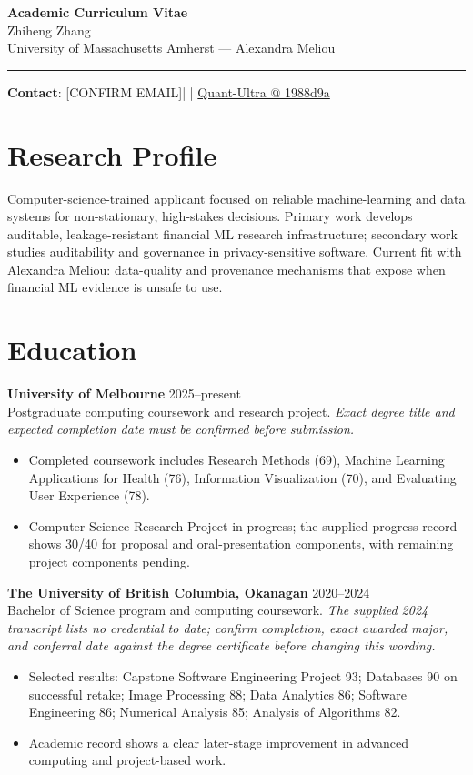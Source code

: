 \documentclass[11pt]{article}
\makeatletter
\newcommand{\ApplicantName}{Zhiheng Zhang}
\newcommand{\ApplicantEmail}{[CONFIRM EMAIL]}
\newcommand{\ApplicantPhone}{[CONFIRM PHONE]}
\newcommand{\ApplicantGitHub}{\href{https://github.com/zhiheng-zhang-Mera/Quant-Ultra/tree/1988d9a8530da91a8158de864d098ea869098923}{Quant-Ultra @ 1988d9a}}
\makeatother
\begin{document}
\begin{center}
{\LARGE\bfseries Academic Curriculum Vitae}\\[0.25em]
{\large \ApplicantName}\\
University of Massachusetts Amherst --- Alexandra Meliou
\end{center}
\vspace{0.35em}\hrule\vspace{0.65em}

\textbf{Contact}: \ApplicantEmail\quad | \quad \ApplicantPhone\quad | \quad \ApplicantGitHub

\section*{Research Profile}
Computer-science-trained applicant focused on reliable machine-learning and data systems for non-stationary, high-stakes decisions. Primary work develops auditable, leakage-resistant financial ML research infrastructure; secondary work studies auditability and governance in privacy-sensitive software. Current fit with Alexandra Meliou: data-quality and provenance mechanisms that expose when financial ML evidence is unsafe to use.

\section*{Education}
\textbf{University of Melbourne} \hfill 2025--present\\
Postgraduate computing coursework and research project. \textit{Exact degree title and expected completion date must be confirmed before submission.}
\begin{itemize}
\item Completed coursework includes Research Methods (69), Machine Learning Applications for Health (76), Information Visualization (70), and Evaluating User Experience (78).
\item Computer Science Research Project in progress; the supplied progress record shows 30/40 for proposal and oral-presentation components, with remaining project components pending.
\end{itemize}

\textbf{The University of British Columbia, Okanagan} \hfill 2020--2024\\
Bachelor of Science program and computing coursework. \textit{The supplied 2024 transcript lists no credential to date; confirm completion, exact awarded major, and conferral date against the degree certificate before changing this wording.}
\begin{itemize}
\item Selected results: Capstone Software Engineering Project 93; Databases 90 on successful retake; Image Processing 88; Data Analytics 86; Software Engineering 86; Numerical Analysis 85; Analysis of Algorithms 82.
\item Academic record shows a clear later-stage improvement in advanced computing and project-based work.
\end{itemize}
\end{document}
